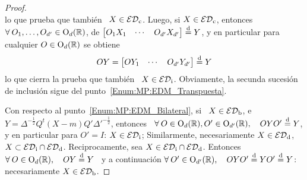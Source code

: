 \begin{proof}
\[  \]
  lo que prueba  que tambi\'en \ $X \in \mathcal{ED}_{\mathrm{c}}$.  Luego,  si $X \in \mathcal{ED}_{\mathrm{c}}$,
  entonces  \  $\forall  \:  O_1  ,  \ldots  ,  O_{d'}  \in  \mathrm{O}_d(\mathbb{R})$,  de
  $\begin{bmatrix} O_1 X_1  & \cdots & O_{d'} X_{d'}  \end{bmatrix} \stackrel{\mathrm{d}}{=} Y$, y
  en particular para cualquier $O \in \mathrm{O}_d(\mathbb{R})$ se obtiene
  \[
  O Y = \begin{bmatrix} O Y_1 & \cdots & O_{d'} Y_{d'} \end{bmatrix} \stackrel{\mathrm{d}}{=} Y
  \]
  lo que  cierra la  prueba que  tambi\'en \ $X  \in \mathcal{ED}_{\mathrm{i}}$.   Obviamente, la
  secunda        sucesi\'on        de        inclusi\'on        sigue        del
  punto~\ref{Enum:MP:EDM_Transpuesta}.


  Con respecto al punto~\ref{Enum:MP:EDM_Bilateral}, si  \ $X \in \mathcal{ED}_{\mathrm{b}}$, e \
  $Y =  \Delta^{-\frac12} Q^t (X-m) Q' \Delta'^{-\frac12}$,  entonces \ $\forall
  \: O \in \mathrm{O}_d(\mathbb{R}), O' \in \mathrm{O}_{d'}(\mathbb{R}),  \quad O Y O' \stackrel{\mathrm{d}}{=} Y$, y en
  particular para  $O' = I$:  $X \in \mathcal{ED}_{\mathrm{i}}$; Similarmente,  necesariamente $X
  \in \mathcal{ED}_{\mathrm{d}}$, \ie $X \subset \mathcal{ED}_{\mathrm{i}} \cap \mathcal{ED}_{\mathrm{d}}$.  Reciprocamente, sea $X
  \in \mathcal{ED}_{\mathrm{i}} \cap \mathcal{ED}_{\mathrm{d}}$.  Entonces  $\forall \: O \in \mathrm{O}_d(\mathbb{R}), \quad
  O Y \stackrel{\mathrm{d}}{=} Y$ \ y  a continuaci\'on $\forall \: O' \in \mathrm{O}_{d'}(\mathbb{R}), \quad
  O Y O' \stackrel{\mathrm{d}}{=} Y O' \stackrel{\mathrm{d}}{=} Y$: necesariamente $X \in \mathcal{ED}_{\mathrm{b}}$.


\end{proof}
